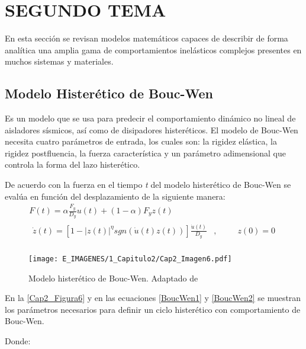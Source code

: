 \section{SEGUNDO TEMA}

En esta sección se revisan modelos matemáticos capaces de describir de forma analítica una amplia gama de comportamientos inelásticos complejos presentes en muchos sistemas y materiales.

	\subsection{Modelo Histerético de Bouc-Wen} \label{subsection:MHBW}
	
Es un modelo que se usa para predecir el comportamiento dinámico no lineal de aisladores sísmicos, así como de disipadores histeréticos. El modelo de Bouc-Wen necesita cuatro parámetros de entrada, los cuales son: la rigidez elástica, la rigidez postfluencia, la fuerza característica y un parámetro adimensional que controla la forma del lazo histerético.

De acuerdo con \citet{Charalampakis2010} la fuerza en el tiempo \textit{t} del modelo histerético de Bouc-Wen se evalúa en función del desplazamiento de la siguiente manera:
\begin{gather}
F(t)=\alpha \frac{F_{y}}{D_{y}}u(t)+(1-\alpha)F_{y}z(t)				\label{BoucWen1} \\
\begin{aligned}
\dot{z}(t)=\left[1-\left|z(t)\right |^{\eta}sgn(\dot{u}(t)z(t))\right]\frac{\dot{u}(t)}{D_{y}}&,&\hspace{1em}& z(0)=0 \\
\end{aligned}		\label{BoucWen2}
\end{gather}

	\begin{figure}[!h]
	\centering
		\texttt{[image: E\_IMAGENES/1\_Capitulo2/Cap2\_Imagen6.pdf]}
	\caption[Modelo histerético de Bouc-Wen]{\centering\footnotesize Modelo histerético de Bouc-Wen. Adaptado de \citet{Charalampakis2010}}
	\label{Cap2_Figura6}
	\end{figure}

En la \autoref{Cap2_Figura6} y en las ecuaciones \ref{BoucWen1} y \ref{BoucWen2} se muestran los parámetros necesarios para definir un ciclo histerético con comportamiento de Bouc-Wen.

Donde:

